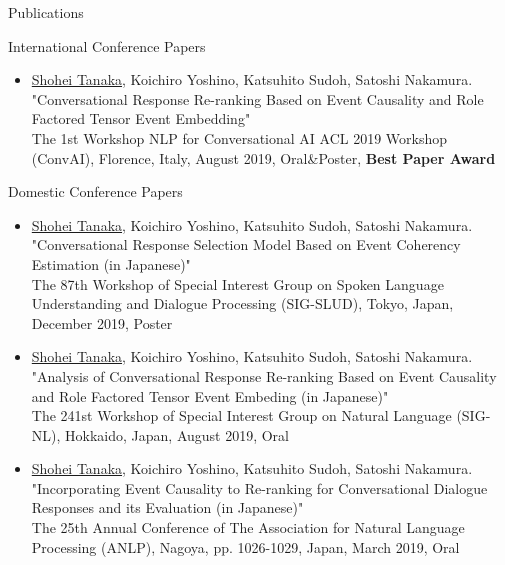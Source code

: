 \documentclass{resume} %
\begin{document}

\begin{rSection}{Publications}

\begin{rSubsection}{International Conference Papers}{}{}{}
\begin{itemize}
\item \underline{Shohei Tanaka}, Koichiro Yoshino, Katsuhito Sudoh, Satoshi Nakamura.
\\"Conversational Response Re-ranking Based on Event Causality and Role Factored Tensor Event Embedding"
\\The 1st Workshop NLP for Conversational AI ACL 2019 Workshop (ConvAI), Florence, Italy, August 2019, Oral\&Poster, {\bf Best Paper Award}
\end{itemize}
\end{rSubsection}

\begin{rSubsection}{Domestic Conference Papers}{}{}{}
\begin{itemize}
\item \underline{Shohei Tanaka}, Koichiro Yoshino, Katsuhito Sudoh, Satoshi Nakamura.
\\"Conversational Response Selection Model Based on Event Coherency Estimation (in Japanese)"
\\The 87th Workshop of Special Interest Group on Spoken Language Understanding and Dialogue Processing (SIG-SLUD), Tokyo, Japan, December 2019, Poster

\item \underline{Shohei Tanaka}, Koichiro Yoshino, Katsuhito Sudoh, Satoshi Nakamura.
\\"Analysis of Conversational Response Re-ranking Based on Event Causality and Role Factored Tensor Event Embeding (in Japanese)"
\\The 241st Workshop of Special Interest Group on Natural Language (SIG-NL), Hokkaido, Japan, August 2019, Oral

\item \underline{Shohei Tanaka}, Koichiro Yoshino, Katsuhito Sudoh, Satoshi Nakamura.
\\"Incorporating Event Causality to Re-ranking for Conversational Dialogue Responses and its Evaluation (in Japanese)"
\\The 25th Annual Conference of The Association for Natural Language Processing (ANLP), Nagoya, pp. 1026-1029, Japan, March 2019, Oral


\end{itemize}
\end{rSubsection}
\end{rSection}
\end{document}
